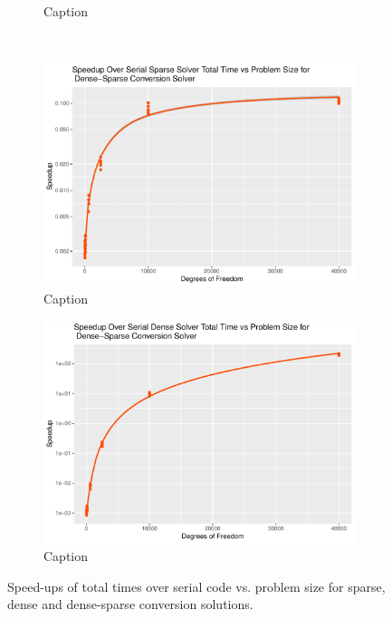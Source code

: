 \begin{figure}
\begin{subfigure}{0.48\linewidth}
		\caption{Caption}
		\label{fig:tot_dense}
	\end{subfigure}\\
	\begin{subfigure}{0.48\linewidth}
		\centering
		\includegraphics[width=\linewidth]{Plots/total_dnsspr_cpu_sparse_speedup_vs_n}
		\caption{Caption}
		\label{fig:tot_dnsspr_sparse}
	\end{subfigure}\hfill
	\begin{subfigure}{0.48\linewidth}
		\centering
		\includegraphics[width=\linewidth]{Plots/total_dnsspr_cpu_dense_speedup_vs_n}
		\caption{Caption}
		\label{fig:tot_dnsspr_dense}
	\end{subfigure}
	\caption{Speed-ups of total times over serial code vs. problem size for sparse, dense and dense-sparse conversion solutions.}
	\label{fig:tot}
\end{figure}

